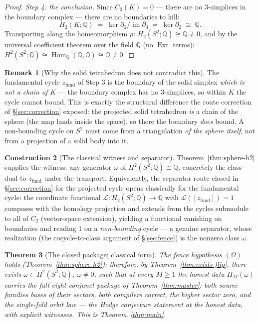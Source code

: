 \documentclass[11pt,a4paper]{article}
\theoremstyle{plain}
\newtheorem{theorem}{Theorem}[section]
\theoremstyle{definition}
\newtheorem{construction}[theorem]{Construction}
\newtheorem{remark}[theorem]{Remark}
\newcommand{\Q}{\mathbb{Q}}
\newcommand{\Hom}{\operatorname{Hom}}
\begin{document}
\begin{proof}
\emph{Step 4: the conclusion.}  Since $C_3(K) = 0$ --- there are no
$3$-simplices in the boundary complex --- there are no boundaries to
kill:
\[
H_2(K;\Q) \;=\; \ker \partial_2 / \operatorname{im} \partial_3
\;=\; \ker \partial_2 \;\cong\; \Q .
\]
Transporting along the homeomorphism $\rho$:
$H_2(S^2;\Q) \cong \Q \ne 0$, and by the universal coefficient
theorem over the field $\Q$ (no $\operatorname{Ext}$ terms):
$H^2(S^2;\Q) \cong \Hom_\Q(\Q, \Q) \cong \Q \ne 0$.
\end{proof}

\begin{remark}[Why the solid tetrahedron does not contradict this]
The fundamental cycle $z_{\mathrm{fund}}$ of Step 3 is the boundary
of the solid simplex \emph{which is not a chain of $K$} --- the
boundary complex has no $3$-simplices, so within $K$ the cycle
cannot bound.  This is exactly the structural difference the route
correction of \S\ref{sec:correction} exposed: the projected solid
tetrahedron \emph{is} a chain of the sphere (the map lands inside
the space), so there the boundary \emph{does} bound.  A non-bounding
cycle on $S^2$ must come from a triangulation \emph{of the sphere
itself}, not from a projection of a solid body into it.
\end{remark}

\begin{construction}[The classical witness and separator]
\label{con:classical-separator}
Theorem~\ref{thm:sphere-h2} supplies the witness: any generator
$\omega$ of $H^2(S^2;\Q) \cong \Q$, concretely the class dual to
$z_{\mathrm{fund}}$ under the transport.  Equivalently, the
separator route closed in \S\ref{sec:correction} for the projected
cycle opens classically for the fundamental cycle: the coordinate
functional $\mathcal{L} : H_2(S^2;\Q) \to \Q$ with
$\mathcal{L}([z_{\mathrm{fund}}]) = 1$ composes with the homology
projection and extends from the cycles submodule to all of $C_2$
(vector-space extension), yielding a functional vanishing on
boundaries and reading $1$ on a \emph{non-bounding} cycle --- a
genuine separator, whose realization (the cocycle-to-class argument
of \S\ref{sec:fence}) is the nonzero class $\omega$.
\end{construction}

\begin{theorem}[The closed package; classical form]
\label{thm:closed}
The fence hypothesis $(\Omega)$ holds
(Theorem~\ref{thm:sphere-h2}); therefore, by
Theorem~\ref{thm:exists-flip}, there exists $\omega \in
H^2(S^2;\Q)$, $\omega \ne 0$, such that at every $M \ge 1$ the
honest data $H_M(\omega)$ carries the full eight-conjunct package of
Theorem~\ref{thm:master}: both source families bases of their
sectors, both compilers correct, the higher sector zero, and the
single-fold orbit law --- the Hodge conjecture statement at the
honest data, with explicit witnesses.  This is
Theorem~\ref{thm:main}.
\end{theorem}
\end{document}
